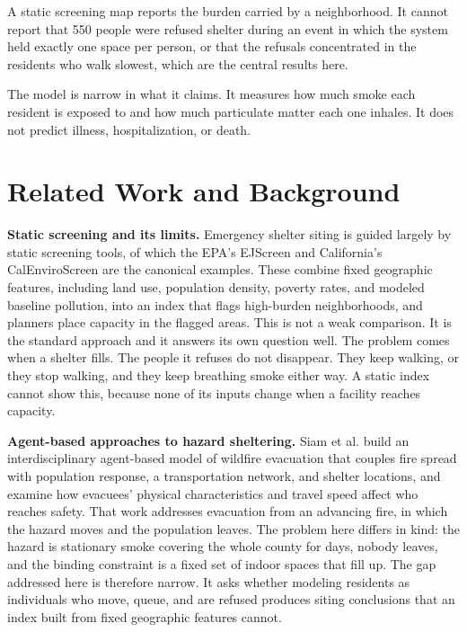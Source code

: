 \documentclass[graybox]{svmult}
\begin{document}
A static screening map reports the burden carried by a neighborhood. It cannot
report that 550 people were refused shelter during an event in which the system
held exactly one space per person, or that the refusals concentrated in the
residents who walk slowest, which are the central results here.

The model is narrow in what it claims. It measures how much smoke each resident
is exposed to and how much particulate matter each one inhales. It does not
predict illness, hospitalization, or death.

\section{Related Work and Background}
\label{sec:related}

\textbf{Static screening and its limits.} Emergency shelter siting is guided
largely by static screening tools, of which the EPA's EJScreen and California's
CalEnviroScreen are the canonical examples. These combine fixed geographic
features, including land use, population density, poverty rates, and modeled
baseline pollution, into an index that flags high-burden neighborhoods, and
planners place capacity in the flagged areas. This is not a weak comparison. It
is the standard approach and it answers its own question well. The problem comes
when a shelter fills. The people it refuses do not disappear. They keep walking,
or they stop walking, and they keep breathing smoke either way. A static index
cannot show this, because none of its inputs change when a facility reaches
capacity.

\textbf{Agent-based approaches to hazard sheltering.} Siam et al.
\cite{siam2022} build an interdisciplinary agent-based model of wildfire
evacuation that couples fire spread with population response, a transportation
network, and shelter locations, and examine how evacuees' physical
characteristics and travel speed affect who reaches safety. That work addresses
evacuation from an advancing fire, in which the hazard moves and the population
leaves. The problem here differs in kind: the hazard is stationary smoke covering
the whole county for days, nobody leaves, and the binding constraint is a fixed
set of indoor spaces that fill up. The gap addressed here is therefore narrow. It
asks whether modeling residents as individuals who move, queue, and are refused
produces siting conclusions that an index built from fixed geographic features
cannot.
\end{document}

